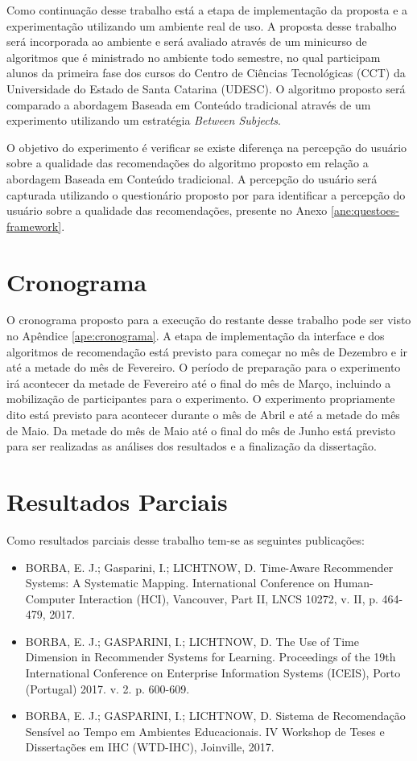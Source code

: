 Como continuação desse trabalho está a etapa de implementação da proposta e a experimentação utilizando um ambiente
real de uso. A proposta desse trabalho será incorporada ao ambiente \adaptweb e será avaliado através de um minicurso de
algoritmos que é ministrado no ambiente todo semestre, no qual participam alunos da primeira fase dos cursos
do Centro de Ciências Tecnológicas (CCT) da Universidade do Estado de Santa Catarina (UDESC). O algoritmo proposto será
comparado a abordagem Baseada em Conteúdo tradicional através de um experimento utilizando um estratégia \textit{Between Subjects}.

O objetivo do experimento é verificar se existe diferença na percepção do usuário sobre a qualidade das recomendações do
algoritmo proposto em relação a abordagem Baseada em Conteúdo tradicional. A percepção do usuário será capturada utilizando
o questionário proposto por  para identificar a percepção do usuário sobre a qualidade das recomendações,
presente no Anexo \ref{ane:questoes-framework}.

\section{Cronograma}

O cronograma proposto para a execução do restante desse trabalho pode ser visto no Apêndice \ref{ape:cronograma}. A etapa
de implementação da interface e dos algoritmos de recomendação está previsto para começar no mês de Dezembro e ir até
a metade do mês de Fevereiro. O período de preparação para o experimento irá acontecer da metade de Fevereiro até o
final do mês de Março, incluindo a mobilização de participantes para o experimento. O experimento propriamente dito está
previsto para acontecer durante o mês de Abril e até a metade do mês de Maio. Da metade do mês de Maio até o final do mês de Junho
está previsto para ser realizadas as análises dos resultados e a finalização da dissertação.

\section{Resultados Parciais}

Como resultados parciais desse trabalho tem-se as seguintes publicações:

\begin{itemize}
\item BORBA, E. J.; Gasparini, I.; LICHTNOW, D. Time-Aware Recommender Systems: A Systematic Mapping. International Conference on Human-Computer Interaction (HCI), Vancouver, Part II, LNCS 10272, v. II, p. 464-479, 2017.
\item BORBA, E. J.; GASPARINI, I.; LICHTNOW, D. The Use of Time Dimension in Recommender Systems for Learning. Proceedings of the 19th International Conference on Enterprise Information Systems (ICEIS), Porto (Portugal) 2017. v. 2. p. 600-609.
\item BORBA, E. J.; GASPARINI, I.; LICHTNOW, D. Sistema de Recomendação Sensível ao Tempo em Ambientes Educacionais. IV Workshop de Teses e Dissertações em IHC (WTD-IHC), Joinville, 2017.
\end{itemize}